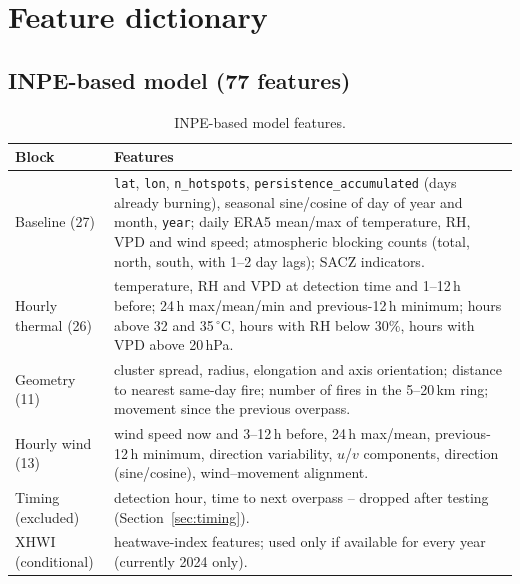 \documentclass[11pt,a4paper,oneside]{report}
\newcommand{\code}[1]{\texttt{\small #1}}
\begin{document}
\appendix

\chapter{Feature dictionary}\label{app:features}

\section{INPE-based model (77 features)}

\begin{table}[H]
\centering\small
\caption{INPE-based model features.}
\begin{tabularx}{\linewidth}{>{\raggedright\arraybackslash}p{3.2cm} >{\raggedright\arraybackslash}X}
\toprule
Block & Features \\
\midrule
Baseline (27) & \code{lat}, \code{lon}, \code{n\_hotspots}, \code{persistence\_accumulated}
(days already burning), seasonal sine/cosine of day of year and month,
\code{year}; daily ERA5 mean/max of temperature, RH, VPD and wind speed;
atmospheric blocking counts (total, north, south, with 1--2 day lags); SACZ
indicators. \\
\addlinespace
Hourly thermal (26) & temperature, RH and VPD at detection time and 1--12\,h
before; 24\,h max/mean/min and previous-12\,h minimum; hours above 32 and
35\,$^\circ$C, hours with RH below 30\%, hours with VPD above 20\,hPa. \\
\addlinespace
Geometry (11) & cluster spread, radius, elongation and axis orientation; distance
to nearest same-day fire; number of fires in the 5--20\,km ring; movement since
the previous overpass. \\
\addlinespace
Hourly wind (13) & wind speed now and 3--12\,h before, 24\,h max/mean,
previous-12\,h minimum, direction variability, $u$/$v$ components, direction
(sine/cosine), wind--movement alignment. \\
\addlinespace
Timing (excluded) & detection hour, time to next overpass -- dropped after testing
(Section~\ref{sec:timing}). \\
\addlinespace
XHWI (conditional) & 13 heatwave-index features; used only if available for every
year (currently 2024 only). \\
\bottomrule
\end{tabularx}
\end{table}
\end{document}

